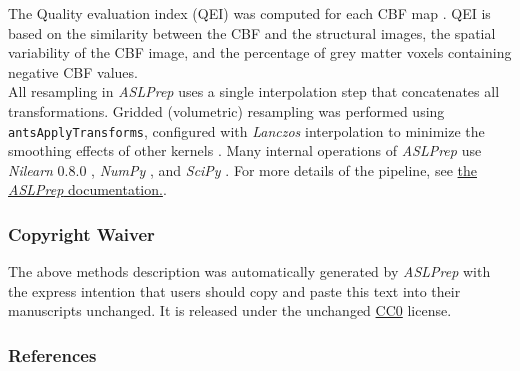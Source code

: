 \documentclass[]{article}
\begin{document}
The Quality evaluation index (QEI) was computed for each CBF map
\citep{cbfqc}. QEI is based on the similarity between the CBF and the
structural images, the spatial variability of the CBF image, and the
percentage of grey matter voxels containing negative CBF values.\\
All resampling in \emph{ASLPrep} uses a single interpolation step that
concatenates all transformations. Gridded (volumetric) resampling was
performed using \texttt{antsApplyTransforms}, configured with
\emph{Lanczos} interpolation to minimize the smoothing effects of other
kernels \citep{lanczos}. Many internal operations of \emph{ASLPrep} use
\emph{Nilearn} 0.8.0 \citep{nilearn}, \emph{NumPy} \citep{numpy}, and
\emph{SciPy} \citep{scipy}. For more details of the pipeline, see
\href{https://aslprep.readthedocs.io/en/latest/workflows.html}{the
\emph{ASLPrep} documentation.}.

\hypertarget{copyright-waiver}{%
\subsubsection{Copyright Waiver}\label{copyright-waiver}}

The above methods description was automatically generated by
\emph{ASLPrep} with the express intention that users should copy and
paste this text into their manuscripts unchanged. It is released under
the unchanged
\href{https://creativecommons.org/publicdomain/zero/1.0/}{CC0} license.

\hypertarget{references}{%
\subsubsection{References}\label{references}}


\end{document}

